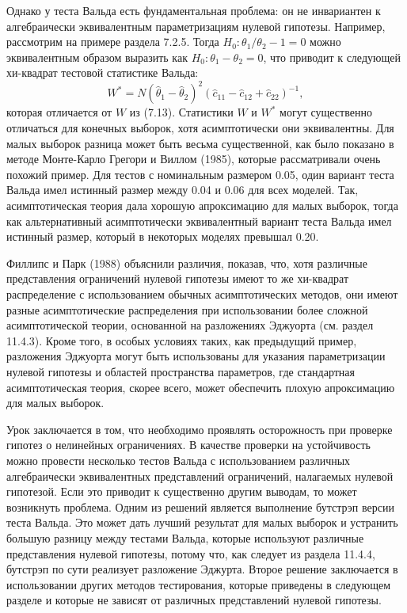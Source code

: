 Однако у теста Вальда есть фундаментальная проблема: он не инвариантен к алгебраически эквивалентным параметризациям нулевой гипотезы. Например, рассмотрим на примере раздела 7.2.5. Тогда $H_0: \theta_1/\theta_2 - 1 = 0$ можно эквивалентным образом выразить как $H_0: \theta_1 - \theta_2 = 0$, что приводит к следующей хи-квадрат тестовой статистике Вальда:
\begin{equation}
W^* = N(\hat{\theta}_1 - \hat{\theta}_2)^2(\hat{c}_{11} - \hat{c}_{12} + \hat{c}_{22})^{-1},
\end{equation}
которая отличается от $W$ из (7.13). Статистики $W$ и $W^*$ могут существенно отличаться для конечных выборок, хотя асимптотически они эквивалентны. Для малых выборок разница может быть весьма существенной, как было показано в методе Монте-Карло Грегори и Виллом (1985), которые рассматривали очень похожий пример. Для тестов с номинальным размером 0.05, один вариант теста Вальда имел истинный размер между 0.04 и 0.06 для всех моделей. Так, асимптотическая теория дала хорошую апроксимацию для малых выборок, тогда как альтернативный асимптотически эквивалентный вариант теста Вальда имел истинный размер, который в некоторых моделях превышал 0.20.

Филлипс и Парк (1988) объяснили различия, показав, что, хотя различные представления ограничений нулевой гипотезы  имеют то же хи-квадрат распределение с использованием обычных асимптотических методов, они имеют разные асимптотические распределения при использовании более сложной асимптотической теории, основанной на разложениях Эджуорта (см. раздел 11.4.3). Кроме того, в особых условиях таких, как предыдущий пример, разложения Эджуорта могут быть использованы для указания параметризации нулевой гипотезы и областей пространства параметров, где стандартная асимптотическая теория, скорее всего, может обеспечить плохую апроксимацию для малых выборок.

Урок заключается в том, что необходимо проявлять осторожность при проверке гипотез о нелинейных ограничениях. В качестве проверки на устойчивость можно провести несколько тестов Вальда с использованием различных алгебраически эквивалентных представлений ограничений, налагаемых нулевой гипотезой. Если это приводит к существенно другим выводам, то может возникнуть проблема. Одним из решений является выполнение бутстрэп версии теста Вальда. Это может дать лучший результат для малых выборок и устранить большую разницу между тестами Вальда, которые используют различные представления нулевой гипотезы, потому что, как следует из раздела 11.4.4, бутстрэп по сути реализует разложение Эджурта. Второе решение заключается в использовании других методов тестирования, которые приведены в следующем разделе и которые не зависят от различных представлений нулевой гипотезы.

